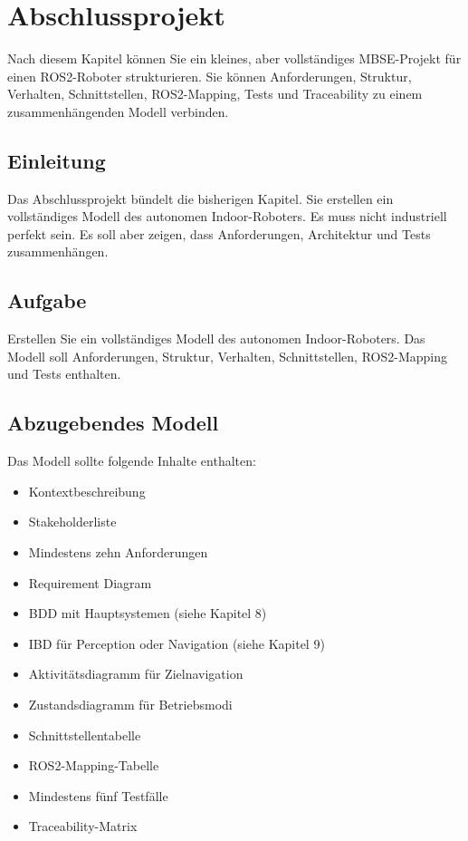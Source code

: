 \chapter{Abschlussprojekt}

\begin{lernziele}
Nach diesem Kapitel können Sie ein kleines, aber vollständiges MBSE-Projekt für einen ROS2-Roboter strukturieren. Sie können Anforderungen, Struktur, Verhalten, Schnittstellen, ROS2-Mapping, Tests und Traceability zu einem zusammenhängenden Modell verbinden.
\end{lernziele}

\section{Einleitung}
Das Abschlussprojekt bündelt die bisherigen Kapitel. Sie erstellen ein vollständiges Modell des autonomen Indoor-Roboters. Es muss nicht industriell perfekt sein. Es soll aber zeigen, dass Anforderungen, Architektur und Tests zusammenhängen.

\section{Aufgabe}
Erstellen Sie ein vollständiges Modell des autonomen Indoor-Roboters. Das Modell soll Anforderungen, Struktur, Verhalten, Schnittstellen, ROS2-Mapping und Tests enthalten.

\section{Abzugebendes Modell}
Das Modell sollte folgende Inhalte enthalten:

\begin{itemize}
    \item Kontextbeschreibung
    \item Stakeholderliste
    \item Mindestens zehn Anforderungen
    \item Requirement Diagram
    \item BDD mit Hauptsystemen (siehe Kapitel 8)
    \item IBD für Perception oder Navigation (siehe Kapitel 9)
    \item Aktivitätsdiagramm für Zielnavigation
    \item Zustandsdiagramm für Betriebsmodi
    \item Schnittstellentabelle
    \item ROS2-Mapping-Tabelle
    \item Mindestens fünf Testfälle
    \item Traceability-Matrix
\end{itemize}

